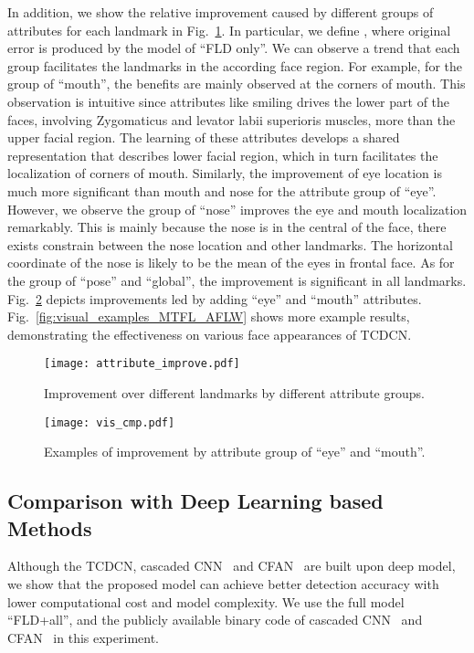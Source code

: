 \documentclass[10pt,journal,compsoc]{IEEEtran}
\begin{document}
In addition, we show the relative improvement caused by different groups of attributes for each landmark in Fig.~\ref{fig:model_improvement}. In particular, we define , where original error is produced by the model of ``FLD only''. We can observe a trend that each group facilitates the landmarks in the according face region. For example, for the group of ``mouth'', the benefits are mainly observed at the corners of mouth. This observation is intuitive since attributes like smiling drives the lower part of the faces, involving Zygomaticus and levator labii superioris muscles, more than the upper facial region. The learning of these attributes develops a shared representation that describes lower facial region, which in turn facilitates the localization of corners of mouth. Similarly, the improvement of eye location is much more significant than mouth and nose for the attribute group of ``eye''. However, we observe the group of ``nose'' improves the eye and mouth localization remarkably. This is mainly because the nose is in the central of the face, there exists constrain between the nose location and other landmarks. The horizontal coordinate of the nose is likely to be the mean of the eyes in frontal face. As for the group of ``pose'' and ``global'', the improvement is significant in all landmarks. Fig.~\ref{fig:vis_improvement} depicts improvements led by adding ``eye'' and ``mouth'' attributes. Fig.~\ref{fig:visual_examples_MTFL_AFLW} shows more example results, demonstrating the effectiveness on various face appearances of TCDCN.

\begin{figure}
  \centering
  \texttt{[image: attribute\_improve.pdf]}\\
  \vskip -0.3cm
  \caption{Improvement over different landmarks by different attribute groups.}
  \label{fig:model_improvement}

\end{figure}
\begin{figure}
  \centering
  \texttt{[image: vis\_cmp.pdf]}\\
  \vskip -0.3cm
  \caption{Examples of improvement by attribute group of ``eye'' and ``mouth''.}
  \label{fig:vis_improvement}

\end{figure}


\subsection{Comparison with Deep Learning based Methods}
\label{subset:cmp_deep}
Although the TCDCN, cascaded CNN~\cite{Sun2013} and CFAN~\cite{zhang2014coarse} are built upon deep model, we show that the proposed model can achieve better detection accuracy with lower computational cost and model complexity. We use the full model ``FLD+all'', and the publicly available binary code of cascaded CNN~\cite{Sun2013} and CFAN~\cite{zhang2014coarse} in this experiment.
\end{document}
